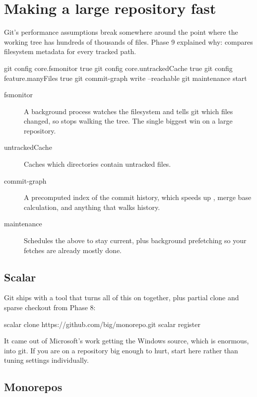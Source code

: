 \documentclass[11pt]{article}
\begin{document}
\section{Making a large repository fast}

Git's performance assumptions break somewhere around the point where the working tree
has hundreds of thousands of files. Phase 9 explained why:  compares
filesystem metadata for every tracked path.

\begin{shell}
git config core.fsmonitor true
git config core.untrackedCache true
git config feature.manyFiles true
git commit-graph write --reachable
git maintenance start
\end{shell}

\begin{description}
  \item[fsmonitor] A background process watches the filesystem and tells git which
    files changed, so  stops walking the tree. The single biggest win
    on a large repository.
  \item[untrackedCache] Caches which directories contain untracked files.
  \item[commit-graph] A precomputed index of the commit history, which speeds up
    , merge base calculation, and anything that walks history.
  \item[maintenance] Schedules the above to stay current, plus background prefetching
    so your fetches are already mostly done.
\end{description}

\subsection{Scalar}

Git ships with a tool that turns all of this on together, plus partial clone and
sparse checkout from Phase 8:

\begin{shell}
scalar clone https://github.com/big/monorepo.git
scalar register
\end{shell}

It came out of Microsoft's work getting the Windows source, which is enormous, into
git. If you are on a repository big enough to hurt, start here rather than tuning
settings individually.

\subsection{Monorepos}
\end{document}
